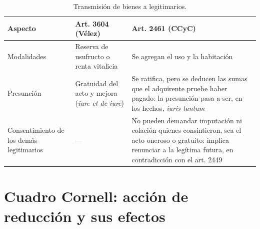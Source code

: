 \documentclass[12pt,oneside]{book}
\begin{document}
\begin{table}[H]
\centering
\small
\begin{tabularx}{\textwidth}{
    >{\raggedright\arraybackslash}p{3.2cm}
    >{\raggedright\arraybackslash}p{3.6cm}
    >{\raggedright\arraybackslash}X
}
\toprule
\textbf{Aspecto} & \textbf{Art. 3604 (Vélez)} & \textbf{Art. 2461 (CCyC)} \\
\midrule
Modalidades & Reserva de usufructo o renta vitalicia & Se agregan el uso y la habitación \\
\addlinespace
Presunción & Gratuidad del acto y mejora (\textit{iure et de iure}) & Se ratifica, pero se deducen las sumas que el adquirente pruebe haber pagado: la presunción pasa a ser, en los hechos, \textit{iuris tantum} \\
\addlinespace
Consentimiento de los demás legitimarios & --- & No pueden demandar imputación ni colación quienes consintieron, sea el acto oneroso o gratuito: implica renunciar a la legítima futura, en contradicción con el art. 2449 \\
\bottomrule
\end{tabularx}
\caption*{Transmisión de bienes a legitimarios.}
\end{table}

\section{Cuadro Cornell: acción de reducción y sus efectos}
\end{document}
